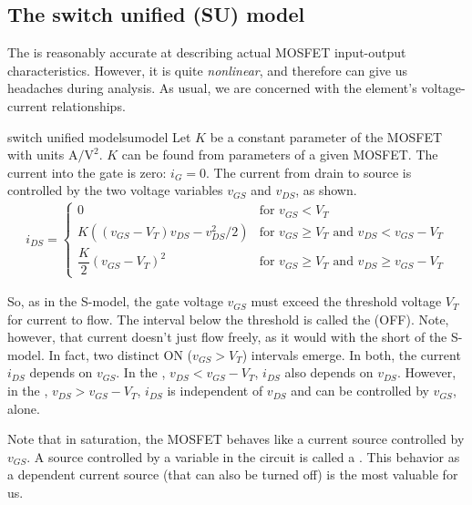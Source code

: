 \documentclass[electronics.tex]{subfiles}
\begin{document}
\subsection{The switch unified (SU) model}
\tags{}

The  is reasonably accurate at describing actual MOSFET input-output characteristics.
However, it is quite \emph{nonlinear}, and therefore can give us headaches during analysis.
As usual, we are concerned with the element's voltage-current relationships.

\begin{Definition}{switch unified model}{sumodel}
	Let $K$ be a constant parameter of the MOSFET with units $\text{A}/\text{V}^2$.
	$K$ can be found from parameters of a given MOSFET.
	The current into the gate is zero: $i_{G} = 0$.
	The current from drain to source is controlled by the two voltage variables $v_{GS}$ and $v_{DS}$, as shown.
	\begin{align*}
		i_{DS} =
		\begin{cases}
			0 & 
			\text{for } v_{GS} < V_T \\
			K
			\left(
				(v_{GS}-V_T) v_{DS} - v_{DS}^2/2
			\right) & 
			\text{for } v_{GS} \ge V_T \text{ and } v_{DS} < v_{GS} - V_T \\
			\dfrac{K}{2}(v_{GS}-V_T)^2 & 
			\text{for } v_{GS} \ge V_T \text{ and } v_{DS} \ge v_{GS} - V_T
		\end{cases}
	\end{align*}
\end{Definition}

So, as in the S-model, the gate voltage $v_{GS}$ must exceed the threshold voltage $V_T$ for current to flow.
The interval below the threshold is called the  (OFF).
Note, however, that current doesn't just flow freely, as it would with the short of the S-model.
In fact, two distinct ON ($v_{GS}>V_T$) intervals emerge.
In both, the current $i_{DS}$ depends on $v_{GS}$.
In the , $v_{DS}<v_{GS} - V_T$, $i_{DS}$ also depends on $v_{DS}$.
However, in the , $v_{DS}>v_{GS} - V_T$, $i_{DS}$ is independent of $v_{DS}$ and can be controlled by $v_{GS}$, alone.

Note that in saturation, the MOSFET behaves like a current source controlled by $v_{GS}$.
A source controlled by a variable in the circuit is called a .
This behavior as a dependent current source (that can also be turned off) is the most valuable for us.
\end{document}
